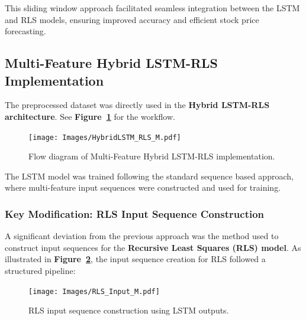 This sliding window approach facilitated seamless integration between the LSTM and RLS models, ensuring improved accuracy and efficient stock price forecasting.

\subsection{Multi-Feature Hybrid LSTM-RLS Implementation}

The preprocessed dataset was directly used in the \textbf{Hybrid LSTM-RLS architecture}. See \textbf{Figure~\ref{fig:HybridLSTM_RLS_M}} for the workflow.

\begin{figure}[h!]
    \centering
    \texttt{[image: Images/HybridLSTM\_RLS\_M.pdf]}
    \caption{Flow diagram of Multi-Feature Hybrid LSTM-RLS implementation.}
    \label{fig:HybridLSTM_RLS_M}
\end{figure}

The LSTM model was trained following the standard sequence based approach, where multi-feature input sequences were constructed and used for training.

\subsubsection{Key Modification: RLS Input Sequence Construction}

A significant deviation from the previous approach was the method used to construct input sequences for the \textbf{Recursive Least Squares (RLS) model}. As illustrated in \textbf{Figure~\ref{fig:RLS_Input_M}}, the input sequence creation for RLS followed a structured pipeline:

\begin{figure}[h!]
    \centering
    \texttt{[image: Images/RLS\_Input\_M.pdf]}
    \caption{RLS input sequence construction using LSTM outputs.}
    \label{fig:RLS_Input_M}
\end{figure}

